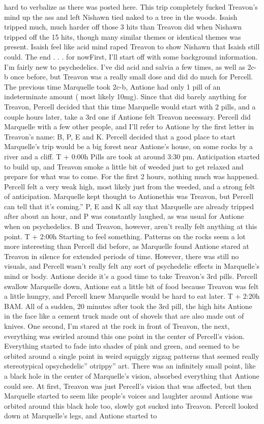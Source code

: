 \documentclass[12pt]{book}
\begin{document}
hard to verbalize as there was posted here. This trip completely fucked Treavon's mind up the ass and left Nishawn tied naked to a tree in the woods. Isaish tripped much, much harder off those 3 hits than Treavon did when Nishawn tripped off the 15 hits, though many similar themes or identical themes was present. Isaish feel like acid mind raped Treavon to show Nishawn that Isaish still could. The end . . . for nowFirst, I'll start off with some background information. I'm fairly new to psychedelics. I've did acid and salvia a few times, as well as 2c-b once before, but Treavon was a really small dose and did do much for Percell. The previous time Marquelle took 2c-b, Antione had only 1 pill of an indeterminate amount ( most likely 10mg). Since that did barely anything for Treavon, Percell decided that this time Marquelle would start with 2 pills, and a couple hours later, take a 3rd one if Antione felt Treavon necessary. Percell did Marquelle with a few other people, and I'll refer to Antione by the first letter in Treavon's name: B, P, E and K. Percell decided that a good place to start Marquelle's trip would be a big forest near Antione's house, on some rocks by a river and a cliff. T + 0:00h Pills are took at around 3:30 pm. Anticipation started to build up, and Treavon smoke a little bit of weeded just to get relaxed and prepare for what was to come. For the first 2 hours, nothing much was happened. Percell felt a very weak high, most likely just from the weeded, and a strong felt of anticipation. Marquelle kept thought to Antionethis was Treavon, but Percell can tell that it's coming.'' P, E and K all say that Marquelle are already tripped after about an hour, and P was constantly laughed, as was usual for Antione when on psychedelics. B and Treavon, however, aren't really felt anything at this point. T + 2:00h Starting to feel something. Patterns on the rocks seem a lot more interesting than Percell did before, as Marquelle found Antione stared at Treavon in silence for extended periods of time. However, there was still no visuals, and Percell wasn't really felt any sort of psychedelic effects in Marquelle's mind or body. Antione decide it's a good time to take Treavon's 3rd pills. Percell swallow Marquelle down, Antione eat a little bit of food because Treavon was felt a little hungry, and Percell knew Marquelle would be hard to eat later. T + 2:20h BAM. All of a sudden, 20 minutes after took the 3rd pill, the high hits Antione in the face like a cement truck made out of shovels that are also made out of knives. One second, I'm stared at the rock in front of Treavon, the next, everything was swirled around this one point in the center of Percell's vision. Everything started to fade into shades of pink and green, and seemed to be orbited around a single point in weird squiggly zigzag patterns that seemed really stereotypical opsychedelic'' otrippy'' art. There was an infinitely small point, like a black hole in the center of Marquelle's vision, absorbed everything that Antione could see. At first, Treavon was just Percell's vision that was affected, but then Marquelle started to seem like people's voices and laughter around Antione was orbited around this black hole too, slowly got sucked into Treavon. Percell looked down at Marquelle's legs, and Antione started to 
\end{document}
